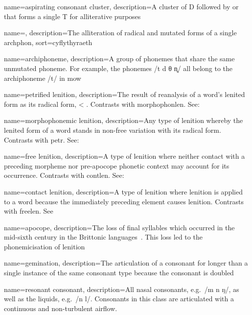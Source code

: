 {
    name=aspirating consonant cluster,
    description={A cluster of \gls{D} followed by  or  that forms a single \gls{T} for alliterative purposes}
}

{
    name={},
    description={The alliteration of radical and mutated forms of a single \gls{archphon}},
    sort={cyflythyraeth}
}

{
    name={archi\-phoneme},
    description={A group of phonemes that share the same unmutated phoneme. For example, the phonemes /t d θ n̥/ all belong to the archiphoneme /t/ in \gls{mow}}
}


{
  name={petrified lenition},
  description={The result of reanalysis of a word's lenited form as its radical form, \eg {} < . Contrasts with \gls{morphophonlen}. See: }
}

{
  name={morphophonemic lenition},
  description={Any type of lenition whereby the lenited form of a word stands in non-free variation with its radical form. Contrasts with \gls{petr}. See:~}
}

{
  name={free lenition},
  description={A type of lenition where neither contact with a preceding morpheme nor pre-apocope phonetic context may account for its occurrence. Contrasts with \gls{contlen}. See:~}
}

{
  name={contact lenition},
  description={A type of lenition where lenition is applied to a word because the immediately preceding element causes lenition. Contrasts with \gls{freelen}. See~}
}

{
  name={apocope},
  description={The loss of final syllables which occurred in the mid-sixth century in the Brittonic languages~\autocite[§§~182, 210]{jackson_language_1953}. This loss led to the phonemicisation of lenition}
}

{
  name={gemination},
  description={The articulation of a consonant for longer than a single instance of the same consonant type because the consonant is doubled}
}

{
  name={resonant consonant},
  description={All nasal consonants, e.g.~/m n ŋ/, as well as the liquids, e.g.~/n l/. Consonants in this class are articulated with a continuous and non-turbulent airflow.}
}

